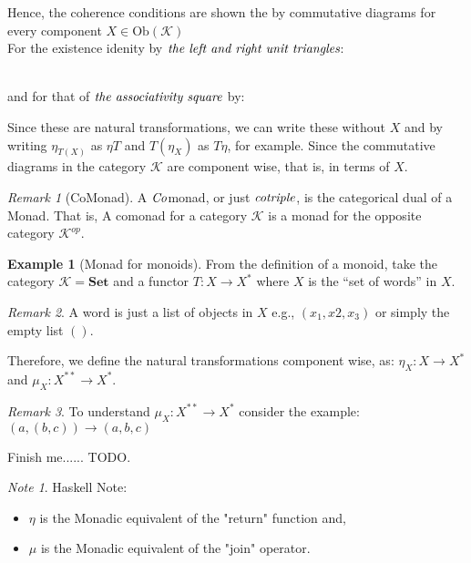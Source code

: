 \documentclass[10pt, oneside, reqno]{amsart}
\theoremstyle{plain}%
\theoremstyle{definition}
\newtheorem{exmp}[thm]{Example}
\theoremstyle{remark}
\newtheorem*{rem}{Remark}
\newtheorem*{note}{Note}
\begin{document}
Hence, the coherence conditions are shown the by commutative diagrams for every component $X \in \text{Ob}(\mathcal{K})$
\\
For the existence idenity by $\emph{the left and right unit triangles}$:
\\
and for that of $\emph{the associativity square}$ by:
Since these are natural transformations,
we can write these without $X$ and by writing $\eta_{T(X)}$ as $\eta T$ and $T(\eta_{X})$ as $T \eta$, for example.
Since the commutative diagrams in the category $\mathcal{K}$ are component wise, that is, in terms of $X$.

\begin{rem}[CoMonad]
 A $\emph{Co}$monad, or just $\emph{cotriple}$, is the categorical dual of a Monad.
 That is, A comonad for a category $\mathcal{K}$ is a monad for the opposite category $\mathcal{K}^{op}$.
\end{rem}


\begin{exmp}[Monad for monoids]
 From the definition of a monoid,
 take the category $\mathcal{K} = \textbf{Set}$ and a functor $T: X \to X^{*}$ where $X$ is the ``set of words'' in $X$.
 \begin{rem}
  A word is just a list of objects in $X$ e.g., $(x_{1}, x{2}, x_{3})$ or simply the empty list $()$.
 \end{rem}
 Therefore, we define the natural transformations component wise, as: $\eta_{X}: X \to X^{*}$ and $\mu_{X}: X^{**} \to X^{*}$.
 \begin{rem}
  To understand $\mu_{X}: X^{**} \to X^{*}$ consider the example: $(a, (b, c)) \to (a, b, c)$
 \end{rem}
 Finish me...... TODO.
\end{exmp}

\begin{note}
Haskell Note:
\begin{itemize}
 \item $\eta$ is the Monadic equivalent of the "return" function and,
 \item $\mu$ is the Monadic equivalent of the "join" operator.
\end{itemize}
\end{note}
\end{document}
